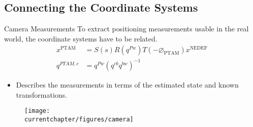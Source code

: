     \subsection{Connecting the Coordinate Systems}
    \begin{frame}{Camera Measurements}
        To extract positioning measurements usable in the real world,
        the coordinate systems have to be related.
        \begin{align*}
            x^{\text{PTAM}} &= S(s) R(q^{Pw}) T(-\varnothing_{\text{PTAM}}) x^{\text{NEDEF}} \\
            q^{PTAM,c} &= q^{Pw} \left(q^{cb} q^{bw}\right)^{-1}
        \end{align*}
\vspace{-1cm}
        \begin{itemize}
            \item Describes the measurements in terms of the estimated state and known transformations.
        \end{itemize}
\vspace{-0.5cm}
        \begin{figure}[h]
        \centering
            \texttt{[image: \\currentchapter/figures/camera]}
        \end{figure}
    \end{frame}

